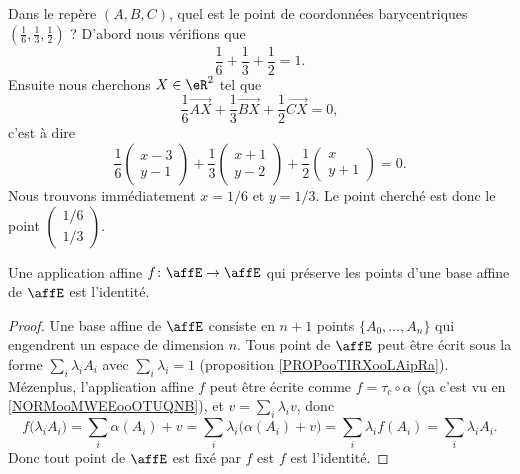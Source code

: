 \begin{example}
    Dans le repère \( (A,B,C)\), quel est le point de coordonnées barycentriques \( (\frac{1}{ 6 },\frac{1}{ 3 },\frac{1}{ 2 })\) ? D'abord nous vérifions que
    \begin{equation}
        \frac{1}{ 6 }+\frac{1}{ 3 }+\frac{1}{ 2 }=1.
    \end{equation}
    Ensuite nous cherchons \( X\in \eR^2\) tel que
    \begin{equation}
        \frac{1}{ 6 }\overrightarrow{ AX }+\frac{1}{ 3 }\overrightarrow{ BX }+\frac{1}{ 2 }\overrightarrow{ CX }=0,
    \end{equation}
    c'est à dire
    \begin{equation}
        \frac{1}{ 6 }\begin{pmatrix}
            x-3    \\ 
            y-1    
        \end{pmatrix}+\frac{1}{ 3 }\begin{pmatrix}
            x+1    \\ 
            y-2    
        \end{pmatrix}+\frac{1}{ 2 }\begin{pmatrix}
            x    \\ 
            y+1    
        \end{pmatrix}=0.
    \end{equation}
    Nous trouvons immédiatement \( x=1/6\) et \( y=1/3\). Le point cherché est donc le point \( \begin{pmatrix}
        1/6    \\ 
        1/3    
    \end{pmatrix}\).
\end{example}

\begin{lemma}       \label{LEMooDUMVooFtfFOe}
    Une application affine \( f\colon \affE\to \affE\) qui préserve les points d'une base affine de $\affE$ est l'identité.
\end{lemma}

\begin{proof}
    Une base affine de \( \affE\) consiste en \( n+1\) points \( \{ A_0,\ldots, A_n \}\) qui engendrent un espace de dimension \( n\). Tous point de \( \affE\) peut être écrit sous la forme \( \sum_i\lambda_iA_i\) avec \( \sum_i\lambda_i=1\) (proposition \ref{PROPooTIRXooLAipRa}). Mézenplus, l'application affine \( f\) peut être écrite comme \( f=\tau_c\circ \alpha\) (ça c'est vu en \ref{NORMooMWEEooOTUQNB}), et \( v=\sum_i\lambda_iv\), donc
    \begin{equation}
        f\big( \lambda_iA_i)=\sum_i\alpha(A_i)+v
        =\sum_i\lambda_i\big( \alpha(A_i)+v \big)
        =\sum_i\lambda_if(A_i)
        =\sum_i\lambda_iA_i.
    \end{equation}
    Donc tout point de \( \affE\) est fixé par \( f\) est \( f\) est l'identité.
\end{proof}

